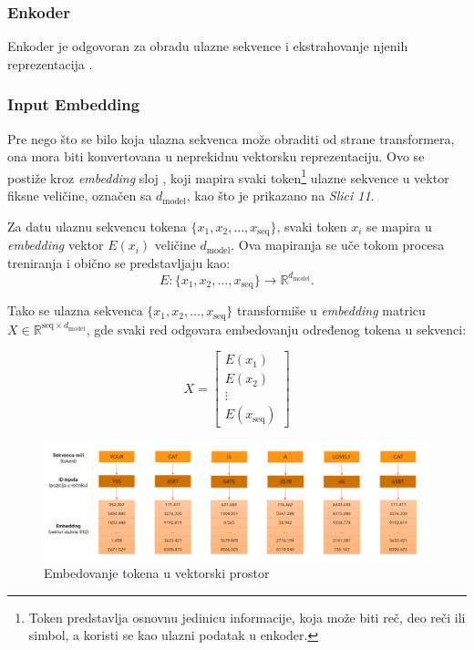 \documentclass[12pt]{article}
\begin{document}
   \subsubsection{Enkoder}
   Enkoder je odgovoran za obradu ulazne sekvence i ekstrahovanje njenih reprezentacija \cite{trans_exp}.

   \subsubsection*{Input Embedding}

   Pre nego što se bilo koja ulazna sekvenca može obraditi od strane transformera, 
   ona mora biti konvertovana u neprekidnu vektorsku reprezentaciju. 
   Ovo se postiže kroz \textit{embedding} sloj , 
   koji mapira svaki token\footnote{Token predstavlja osnovnu jedinicu 
   informacije, koja može biti reč, deo reči ili simbol, a koristi se kao 
   ulazni podatak u enkoder.} ulazne sekvence u vektor fiksne veličine, 
   označen sa \( d_{\text{model}} \), kao što je prikazano na \textit{Slici 11}.

   \newpage
   Za datu ulaznu sekvencu tokena \(\{x_1, x_2, \dots, x_\text{seq}\}\), 
   svaki token \(x_i\) se mapira u \textit{embedding} vektor \(E(x_i)\) 
   veličine \( d_{\text{model}} \). Ova mapiranja se uče tokom procesa treniranja 
   i obično se predstavljaju kao:
   \[
   E: \{x_1, x_2, \dots, x_\text{seq}\} \rightarrow \mathbb{R}^{d_{\text{model}}}.
   \]

   Tako se ulazna sekvenca \(\{x_1, x_2, \dots, x_\text{seq}\}\) transformiše u 
   \textit{embedding} matricu \(X \in \mathbb{R}^{\text{seq} \times d_{\text{model}}}\), gde svaki 
   red odgovara embedovanju određenog tokena u sekvenci:

   \[
   X = \begin{bmatrix}
   E(x_1) \\
   E(x_2) \\
   \vdots \\
   E(x_\text{seq})
   \end{bmatrix}
   \]

   \begin{figure}[h!]
      \hspace{-2cm} %
      \includegraphics[width=1.3\textwidth]{token.png}
      \caption{Embedovanje tokena u vektorski prostor \cite{transformer}}
      \label{fig:token_embedding}
   \end{figure}
\end{document}

